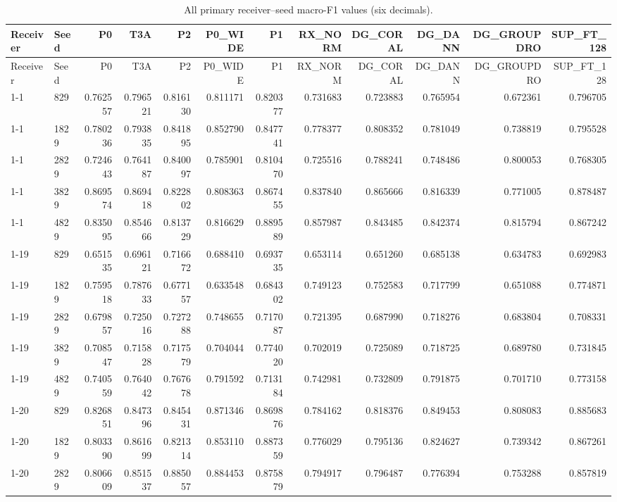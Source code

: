 \small
\begin{longtable}{llrrrrrrrrrr}
\caption{All primary receiver--seed macro-F1 values (six decimals).}\\
Receiver & Seed & P0 & T3A & P2 & P0\_WIDE & P1 & RX\_NORM & DG\_CORAL & DG\_DANN & DG\_GROUPDRO & SUP\_FT\_128\\ \hline \endfirsthead
Receiver & Seed & P0 & T3A & P2 & P0\_WIDE & P1 & RX\_NORM & DG\_CORAL & DG\_DANN & DG\_GROUPDRO & SUP\_FT\_128\\ \hline \endhead
1-1 & 829 & 0.762557 & 0.796521 & 0.816130 & 0.811171 & 0.820377 & 0.731683 & 0.723883 & 0.765954 & 0.672361 & 0.796705\\
1-1 & 1829 & 0.780236 & 0.793835 & 0.841895 & 0.852790 & 0.847741 & 0.778377 & 0.808352 & 0.781049 & 0.738819 & 0.795528\\
1-1 & 2829 & 0.724643 & 0.764187 & 0.840097 & 0.785901 & 0.810470 & 0.725516 & 0.788241 & 0.748486 & 0.800053 & 0.768305\\
1-1 & 3829 & 0.869574 & 0.869418 & 0.822802 & 0.808363 & 0.867455 & 0.837840 & 0.865666 & 0.816339 & 0.771005 & 0.878487\\
1-1 & 4829 & 0.835095 & 0.854666 & 0.813729 & 0.816629 & 0.889589 & 0.857987 & 0.843485 & 0.842374 & 0.815794 & 0.867242\\
1-19 & 829 & 0.651535 & 0.696121 & 0.716672 & 0.688410 & 0.693735 & 0.653114 & 0.651260 & 0.685138 & 0.634783 & 0.692983\\
1-19 & 1829 & 0.759518 & 0.787633 & 0.677157 & 0.633548 & 0.684302 & 0.749123 & 0.752583 & 0.717799 & 0.651088 & 0.774871\\
1-19 & 2829 & 0.679857 & 0.725016 & 0.727288 & 0.748655 & 0.717087 & 0.721395 & 0.687990 & 0.718276 & 0.683804 & 0.708331\\
1-19 & 3829 & 0.708547 & 0.715828 & 0.717579 & 0.704044 & 0.774020 & 0.702019 & 0.725089 & 0.718725 & 0.689780 & 0.731845\\
1-19 & 4829 & 0.740559 & 0.764042 & 0.767678 & 0.791592 & 0.713184 & 0.742981 & 0.732809 & 0.791875 & 0.701710 & 0.773158\\
1-20 & 829 & 0.826851 & 0.847396 & 0.845431 & 0.871346 & 0.869876 & 0.784162 & 0.818376 & 0.849453 & 0.808083 & 0.885683\\
1-20 & 1829 & 0.803390 & 0.861699 & 0.821314 & 0.853110 & 0.887359 & 0.776029 & 0.795136 & 0.824627 & 0.739342 & 0.867261\\
1-20 & 2829 & 0.806609 & 0.851537 & 0.885057 & 0.884453 & 0.875879 & 0.794917 & 0.796487 & 0.776394 & 0.753288 & 0.857819\\

\end{longtable}
